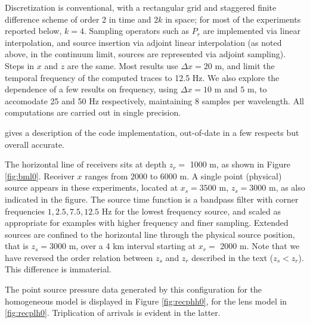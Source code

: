 Discretization is conventional, with a rectangular grid and staggered
finite difference scheme \cite[]{Vir:84} of order 2 in time and
2$k$ in space; for most of the experiments reported below, $k=4$.
Sampling operators such as $P_r$ are implemented via linear
interpolation, and source insertion via adjoint linear interpolation
(as noted above, in the continuum limit, sources are represented via
adjoint sampling). Steps in $x$ and $z$ are the same. Most results use
$\Delta x = 20$ m, and limit the temporal frequency of the computed
traces to 12.5 Hz. We also explore the dependence of a few results on frequency, using
$\Delta x = 10$ m and $5$ m, to accomodate 25 and 50 Hz respectively,
maintaining 8 samples per wavelength. All computations are carried out
in single precision.

\cite{GeoPros:11} gives a description of the code
implementation, out-of-date in a few respects but overall accurate.

The horizontal line of receivers sits at depth $z_r = $ 1000 m, as
shown in Figure \ref{fig:bml0}. Receiver $x$ ranges from $2000$ to
$6000$ m. A single point (physical) source appears in these
experiments, located at $x_s=3500$ m, $z_s=3000$ m, as also indicated
in the figure. The source time function is a bandpass filter with
corner frequencies $1, 2.5, 7.5, 12.5$ Hz for the lowest frequency
source, and scaled as appropriate for examples with higher frequency
and finer sampling.  Extended sources are confined to the horizontal
line through the physical source position, that is $z_s = 3000$ m,
over a 4 km interval starting at $x_r=$ 2000 m. Note that we have
reversed the order relation between $z_s$ and $z_r$ described in the
text ($z_s<z_r$). This difference is immaterial.


The point source pressure data generated by this configuration for the
homogeneous model is displayed in Figure \ref{fig:recphh0}, for the
lens model in \ref{fig:recplh0}. Triplication of arrivals is evident in the latter.



